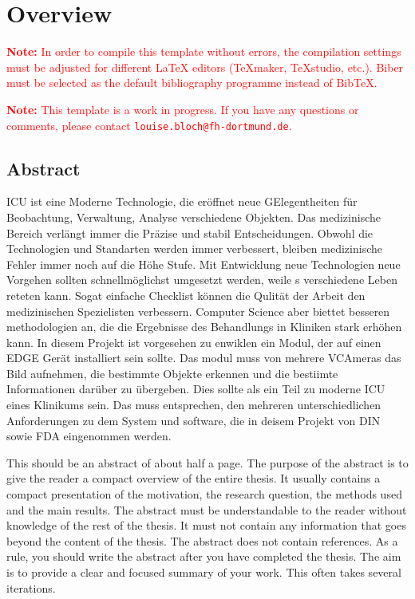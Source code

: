 \documentclass[12pt]{report}           %
\theoremstyle{thesis}        %
\begin{document}
	\setcounter{page}{1}
	
	\chapter*{Overview}
	\textcolor{red}{\textbf{Note:} In order to compile this template without errors, the compilation settings must be adjusted for different LaTeX editors (TeXmaker, TeXstudio, etc.). Biber must be selected as the default bibliography programme instead of BibTeX.}
	
	\textcolor{red}{\textbf{Note:} This template is a work in progress. If you have any questions or comments, please contact \texttt{louise.bloch@fh-dortmund.de}.}
	\section*{Abstract}
	ICU ist eine Moderne Technologie, die eröffnet neue GElegentheiten für Beobachtung, Verwaltung, Analyse verschiedene Objekten. Das medizinische Bereich verlängt immer die Präzise und stabil Entscheidungen. Obwohl die Technologien und Standarten werden immer  verbessert, bleiben medizinische Fehler immer noch auf die Höhe Stufe. Mit Entwicklung neue Technologien neue Vorgehen sollten schnellmöglichst umgesetzt werden, weile s verschiedene Leben reteten kann. Sogat einfache Checklist können die Qulität der Arbeit den medizinischen Spezielisten verbessern. Computer Science aber biettet besseren methodologien an, die die Ergebnisse des Behandlungs in Kliniken  stark erhöhen kann. 
	In diesem Projekt ist vorgesehen zu enwiklen ein Modul, der auf einen EDGE Gerät installiert sein sollte. Das modul muss von mehrere VCAmeras das Bild aufnehmen, die bestimmte Objekte erkennen und die bestiimte Informationen darüber zu übergeben.
	Dies sollte als ein Teil zu moderne ICU eines Klinikums sein. Das muss entsprechen, den mehreren unterschiedlichen Anforderungen zu dem System und software, die in deisem Projekt von DIN sowie FDA eingenommen werden. 
	    
	This should be an abstract of about half a page. The purpose of the abstract is to give the reader a compact overview of the entire thesis. It usually contains a compact presentation of the motivation, the research question, the methods used and the main results. The abstract must be understandable to the reader without knowledge of the rest of the thesis. It must not contain any information that goes beyond the content of the thesis. The abstract does not contain references. 
	As a rule, you should write the abstract after you have completed the thesis. The aim is to provide a clear and focused summary of your work. This often takes several iterations.
\end{document}
